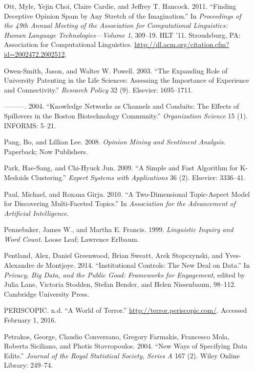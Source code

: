 \documentclass[]{krantz}
\begin{document}
\hypertarget{ref-ott-11}{}
Ott, Myle, Yejin Choi, Claire Cardie, and Jeffrey T. Hancock. 2011.
``Finding Deceptive Opinion Spam by Any Stretch of the Imagination.'' In
\emph{Proceedings of the 49th Annual Meeting of the Association for
Computational Linguistics: Human Language Technologies---Volume 1},
309--19. HLT '11. Stroudsburg, PA: Association for Computational
Linguistics. \url{http://dl.acm.org/citation.cfm?id=2002472.2002512}.

\hypertarget{ref-owen2003expanding}{}
Owen-Smith, Jason, and Walter W. Powell. 2003. ``The Expanding Role of
University Patenting in the Life Sciences: Assessing the Importance of
Experience and Connectivity.'' \emph{Research Policy} 32 (9). Elsevier:
1695--1711.

\hypertarget{ref-owen2004knowledge}{}
---------. 2004. ``Knowledge Networks as Channels and Conduits: The
Effects of Spillovers in the Boston Biotechnology Community.''
\emph{Organization Science} 15 (1). INFORMS: 5--21.

\hypertarget{ref-pang-08}{}
Pang, Bo, and Lillian Lee. 2008. \emph{Opinion Mining and Sentiment
Analysis}. Paperback; Now Publishers.

\hypertarget{ref-park2009simple}{}
Park, Hae-Sang, and Chi-Hyuck Jun. 2009. ``A Simple and Fast Algorithm
for K-Medoids Clustering.'' \emph{Expert Systems with Applications} 36
(2). Elsevier: 3336--41.

\hypertarget{ref-paul-10}{}
Paul, Michael, and Roxana Girju. 2010. ``A Two-Dimensional Topic-Aspect
Model for Discovering Multi-Faceted Topics.'' In \emph{Association for
the Advancement of Artificial Intelligence}.

\hypertarget{ref-pennebaker-99}{}
Pennebaker, James W., and Martha E. Francis. 1999. \emph{Linguistic
Inquiry and Word Count}. Loose Leaf; Lawrence Erlbaum.

\hypertarget{ref-Pentland2014}{}
Pentland, Alex, Daniel Greenwood, Brian Sweatt, Arek Stopczynski, and
Yves-Alexandre de Montjoye. 2014. ``Institutional Controls: The New Deal
on Data.'' In \emph{Privacy, Big Data, and the Public Good: Frameworks
for Engagement}, edited by Julia Lane, Victoria Stodden, Stefan Bender,
and Helen Nissenbaum, 98--112. Cambridge University Press.

\hypertarget{ref-worldterror}{}
PERISCOPIC. n.d. ``A World of Terror.''
\url{http://terror.periscopic.com/}. Accessed February 1, 2016.

\hypertarget{ref-petrakos2004new}{}
Petrakos, George, Claudio Conversano, Gregory Farmakis, Francesco Mola,
Roberta Siciliano, and Photis Stavropoulos. 2004. ``New Ways of
Specifying Data Edits.'' \emph{Journal of the Royal Statistical Society,
Series A} 167 (2). Wiley Online Library: 249--74.
\end{document}
